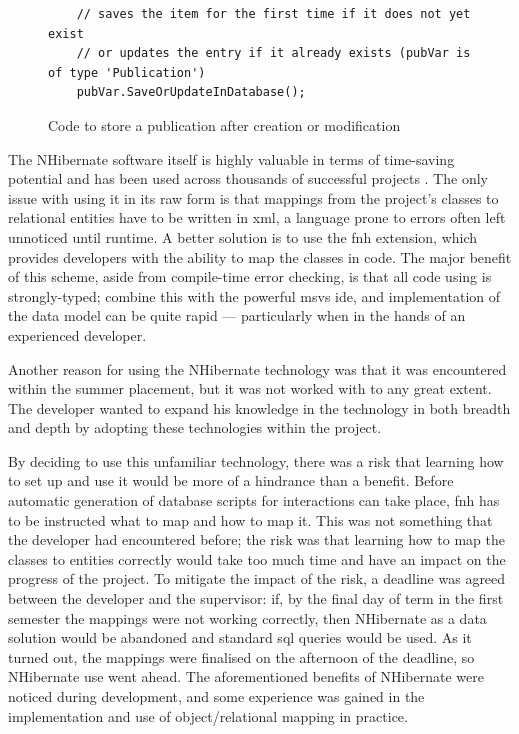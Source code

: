 \begin{figure}
	\begin{center}
			\lstset{language=CSharp} 
			\begin{lstlisting}
	// saves the item for the first time if it does not yet exist
	// or updates the entry if it already exists (pubVar is of type 'Publication')
	pubVar.SaveOrUpdateInDatabase();
			\end{lstlisting}
		\caption{Code to store a publication after creation or modification}
		\label{fig:storePublication}
	\end{center}
\end{figure}

The NHibernate software itself is highly valuable in terms of time-saving potential and has been used across thousands of successful projects \cite{NhUse}.  The only issue with using it in its raw form is that mappings from the project's classes to relational entities have to be written in \gls{xml}, a language prone to errors often left unnoticed until runtime.  A better solution is to use the \gls{fnh} extension, which provides developers with the ability to map the classes in code.  The major benefit of this scheme, aside from compile-time error checking, is that all code using is strongly-typed; combine this with the powerful \gls{msvs} \gls{ide}, and implementation of the data model can be quite rapid --- particularly when in the hands of an experienced developer.

Another reason for using the NHibernate technology was that it was encountered within the summer placement, but it was not worked with to any great extent.  The developer wanted to expand his knowledge in the technology in both breadth and depth by adopting these technologies within the project.

By deciding to use this unfamiliar technology, there was a risk that learning how to set up and use it would be more of a hindrance than a benefit.  Before automatic generation of database scripts for interactions can take place, \gls{fnh} has to be instructed what to map and how to map it.  This was not something that the developer had encountered before; the risk was that learning how to map the classes to entities correctly would take too much time and have an impact on the progress of the project.  To mitigate the impact of the risk, a deadline was agreed between the developer and the supervisor: if, by the final day of term in the first semester the mappings were not working correctly, then NHibernate as a data solution would be abandoned and standard \gls{sql} queries would be used.  As it turned out, the mappings were finalised on the afternoon of the deadline, so NHibernate use went ahead.  The aforementioned benefits of NHibernate were noticed during development, and some experience was gained in the implementation and use of object/relational mapping in practice.


